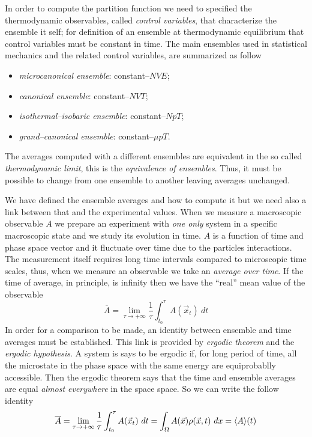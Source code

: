In order to compute the partition function we need to specified the thermodynamic observables, called \textit{control variables}, that characterize the ensemble it self; for definition of an ensemble at thermodynamic equilibrium that control variables must be constant in time. The main ensembles used in statistical mechanics and the related control variables, are summarized as follow
\begin{itemize}
	\item \textit{microcanonical ensemble}: constant--$NVE$; %
	\item \textit{canonical ensemble}: constant--$NVT$; %
	\item \textit{isothermal--isobaric ensemble}: constant--$NpT$; %
	\item \textit{grand--canonical ensemble}: constant--$\mu pT$.%
\end{itemize}
The averages computed with a different ensembles are equivalent in the so called \textit{thermodynamic limit}, this is the \textit{equivalence of ensembles}. Thus, it must be possible to change from one ensemble to another leaving averages unchanged.

We have defined the ensemble averages and how to compute it but we need also a link between that and the experimental values. When we measure a macroscopic observable $A$ we prepare an experiment with \textit{one only} system in a specific macroscopic state and we study its evolution in time. $A$ is a function of time and phase space vector and it fluctuate over time due to the particles interactions. The measurement itself requires long time intervals compared to microscopic time scales, thus, when we measure an observable we take an \textit{average over time}. If the time of average, in principle, is infinity then we have the ``real'' mean value of the observable
\begin{equation*}
	\overline{A} = \lim_{\tau\to +\infty}\frac{1}{\tau}\int_{t_0}^\tau A(\vec x_t)\ dt
	\label{eq:timeAve}
\end{equation*}
In order for a comparison to be made, an identity between ensemble and time averages must be established. This link is provided by \textit{ergodic theorem} and the \textit{ergodic hypothesis}. A system is says to be ergodic if, for long period of time, all the microstate in the phase space with the same energy are equiprobablly accessible. Then the ergodic theorem says that the time and ensemble averages are equal \textit{almost everywhere} in the space space. So we can write the follow identity
\begin{equation}
	\overline{A} = \lim_{\tau\to +\infty}\frac{1}{\tau}\int_{t_0}^\tau A(\vec x_t)\ dt = \int_\Omega A(\vec x)\rho(\vec x, t)\ dx = \langle A \rangle(t)
\end{equation}

